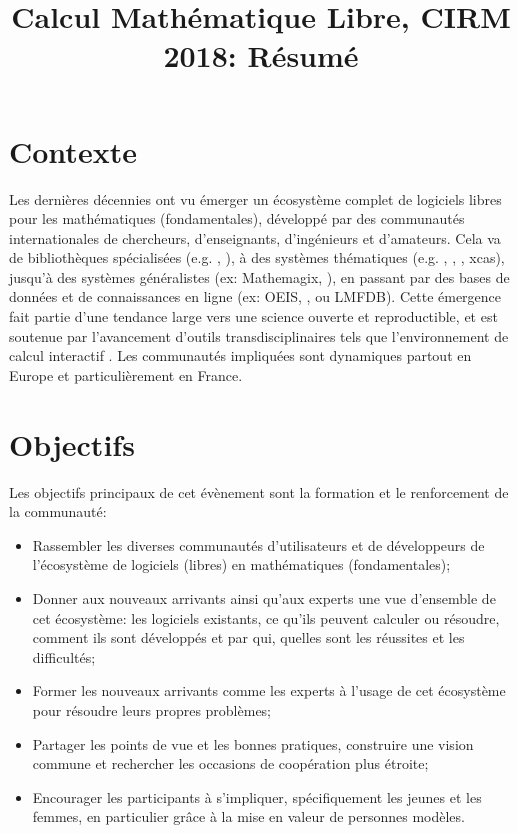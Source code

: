 \documentclass[12pt]{amsart}
\begin{document}
\title{Calcul Mathématique Libre, CIRM 2018: Résumé}
\maketitle
\thispagestyle{empty}

\section*{Contexte}
Les dernières décennies ont vu émerger un écosystème complet de logiciels libres pour les mathématiques (fondamentales), développé par des communautés internationales de chercheurs, d'enseignants, d'ingénieurs et d'amateurs. Cela va de bibliothèques spécialisées (e.g. \MPIR, \Linbox), à des systèmes thématiques (e.g. \GAP, \Pari, \Singular, xcas), jusqu'à des systèmes généralistes (ex: Mathemagix, \Sage), en passant par des bases de données et de connaissances en ligne (ex: OEIS, \MathHub, ou LMFDB). Cette émergence fait partie d'une tendance large vers une science ouverte et reproductible,  et est soutenue par l'avancement d'outils transdisciplinaires tels que l'environnement de calcul interactif \Jupyter. Les communautés impliquées sont dynamiques partout en Europe et particulièrement en France.

\section*{Objectifs}
Les objectifs principaux de cet évènement sont la formation et le renforcement de la communauté:
\begin{itemize}
\item Rassembler les diverses communautés d'utilisateurs et de développeurs de l'écosystème de logiciels (libres) en mathématiques (fondamentales);
\item Donner aux nouveaux arrivants ainsi qu'aux experts une vue d'ensemble de cet écosystème: les logiciels existants, ce qu'ils peuvent calculer ou résoudre, comment ils sont développés et par qui, quelles sont les réussites et les difficultés;
\item Former les nouveaux arrivants comme les experts à l'usage de cet écosystème pour résoudre leurs propres problèmes;
\item Partager les points de vue et les bonnes pratiques, construire une vision commune et rechercher les occasions de coopération plus étroite;
\item Encourager les participants à s'impliquer, spécifiquement les jeunes et les femmes, en particulier grâce à la mise en valeur de personnes modèles.
\end{itemize}
\end{document}
